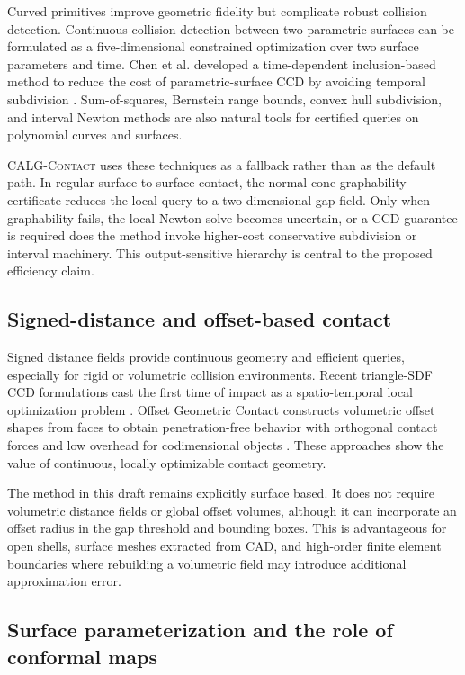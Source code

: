 \documentclass[preprint,12pt]{elsarticle}
\newcommand{\method}{\textsc{CALG-Contact}}
\begin{document}
Curved primitives improve geometric fidelity but complicate robust collision detection. Continuous collision detection between two parametric surfaces can be formulated as a five-dimensional constrained optimization over two surface parameters and time. Chen et al. developed a time-dependent inclusion-based method to reduce the cost of parametric-surface CCD by avoiding temporal subdivision \cite{chen2024tdib}. Sum-of-squares, Bernstein range bounds, convex hull subdivision, and interval Newton methods are also natural tools for certified queries on polynomial curves and surfaces.

\method{} uses these techniques as a fallback rather than as the default path. In regular surface-to-surface contact, the normal-cone graphability certificate reduces the local query to a two-dimensional gap field. Only when graphability fails, the local Newton solve becomes uncertain, or a CCD guarantee is required does the method invoke higher-cost conservative subdivision or interval machinery. This output-sensitive hierarchy is central to the proposed efficiency claim.

\subsection{Signed-distance and offset-based contact}

Signed distance fields provide continuous geometry and efficient queries, especially for rigid or volumetric collision environments. Recent triangle-SDF CCD formulations cast the first time of impact as a spatio-temporal local optimization problem \cite{pelletier2025trisdf}. Offset Geometric Contact constructs volumetric offset shapes from faces to obtain penetration-free behavior with orthogonal contact forces and low overhead for codimensional objects \cite{chen2025ogc}. These approaches show the value of continuous, locally optimizable contact geometry.

The method in this draft remains explicitly surface based. It does not require volumetric distance fields or global offset volumes, although it can incorporate an offset radius in the gap threshold and bounding boxes. This is advantageous for open shells, surface meshes extracted from CAD, and high-order finite element boundaries where rebuilding a volumetric field may introduce additional approximation error.

\subsection{Surface parameterization and the role of conformal maps}
\end{document}
